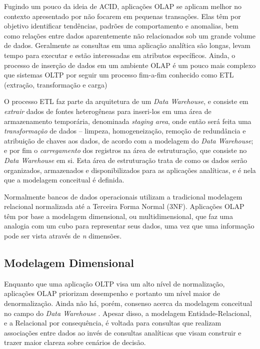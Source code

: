 \documentclass[conference]{IEEEtran}
\begin{document}
Fugindo um pouco da ideia de ACID, aplicações OLAP se aplicam melhor no contexto apresentado por não focarem em pequenas transações. Elas têm por objetivo identificar tendências, padrões de comportamento e anomalias, bem como relações entre dados aparentemente não relacionados \cite{codd1998providing} sob um grande volume de dados. Geralmente as consultas em uma aplicação analítica são longas, levam tempo para executar e estão interessadas em atributos específicos. Ainda, o processo de inserção de dados em um ambiente OLAP é um pouco mais complexo que sistemas OLTP por seguir um processo fim-a-fim conhecido como ETL (extração, transformação e carga) \cite{vertabelo2017olap}

O processo ETL faz parte da arquitetura de um \textit{Data Warehouse}, e consiste em \textit{extrair} dados de fontes heterogêneas para inseri-los em uma área de armazenamento temporária, denominada \textit{staging area}, onde então será feita uma \textit{transformação} de dados -- limpeza, homogeneização, remoção de redundância e atribuição de chaves aos dados, de acordo com a modelagem do \textit{Data Warehouse}; e por fim o \textit{carregamento} dos registros na área de estruturação, que consiste no \textit{Data Warehouse} em si. Esta área de estruturação trata de como os dados serão organizados, armazenados e disponibilizados para as aplicações analíticas, e é nela que a modelagem conceitual é definida.

Normalmente bancos de dados operacionais utilizam a tradicional modelagem relacional normalizada até a Terceira Forma Normal (3NF). Aplicações OLAP têm por base a modelagem dimensional, ou multidimensional, que faz uma analogia com um cubo para representar seus dados, uma vez que uma informação pode ser vista através de \textit{n} dimensões.



\subsection{Modelagem Dimensional}

Enquanto que uma aplicação OLTP visa um alto nível de normalização, aplicações OLAP priorizam desempenho e portanto um nível maior de denormalização. Ainda não há, porém, consenso acerca da modelagem conceitual no campo do \textit{Data Warehouse} \cite{sen2005comparison}. Apesar disso, a modelagem Entidade-Relacional, e a Relacional por consequência, é voltada para consultas que realizam associações entre dados ao invés de consultas analíticas \cite{kimball2002dw} que visam construir e trazer maior clareza sobre cenários de decisão.
\end{document}
